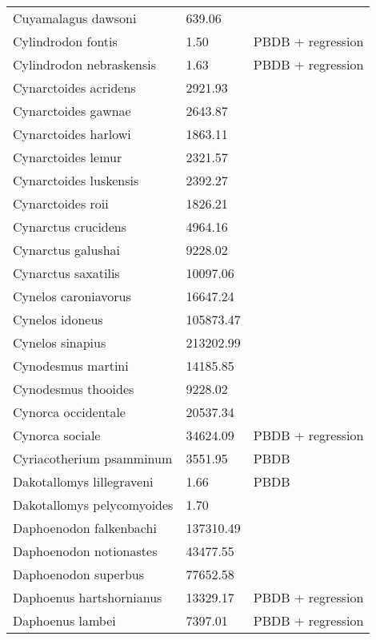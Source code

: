 \documentclass{article}
\begin{document}
\begin{center}
\begin{longtable}{p{} p{} p{}}
    Cuyamalagus dawsoni & 639.06 & \cite{Tomiya2013} \\ 
    Cylindrodon fontis & 1.50 & PBDB + regression \\ 
    Cylindrodon nebraskensis & 1.63 & PBDB + regression \\ 
    Cynarctoides acridens & 2921.93 & \cite{Tomiya2013} \\ 
    Cynarctoides gawnae & 2643.87 & \cite{Tomiya2013} \\ 
    Cynarctoides harlowi & 1863.11 & \cite{Tomiya2013} \\ 
    Cynarctoides lemur & 2321.57 & \cite{Tomiya2013} \\ 
    Cynarctoides luskensis & 2392.27 & \cite{Tomiya2013} \\ 
    Cynarctoides roii & 1826.21 & \cite{Tomiya2013} \\ 
    Cynarctus crucidens & 4964.16 & \cite{Tomiya2013} \\ 
    Cynarctus galushai & 9228.02 & \cite{Tomiya2013} \\ 
    Cynarctus saxatilis & 10097.06 & \cite{Tomiya2013} \\ 
    Cynelos caroniavorus & 16647.24 & \cite{Tomiya2013} \\ 
    Cynelos idoneus & 105873.47 & \cite{Tomiya2013} \\ 
    Cynelos sinapius & 213202.99 & \cite{Tomiya2013} \\ 
    Cynodesmus martini & 14185.85 & \cite{Tomiya2013} \\ 
    Cynodesmus thooides & 9228.02 & \cite{Tomiya2013} \\ 
    Cynorca occidentale & 20537.34 & \cite{Tomiya2013} \\ 
    Cynorca sociale & 34624.09 & PBDB + regression \\ 
    Cyriacotherium psamminum & 3551.95 & PBDB \\ 
    Dakotallomys lillegraveni & 1.66 & PBDB \\ 
    Dakotallomys pelycomyoides & 1.70 & \cite{Mihlbachler2006} \\ 
    Daphoenodon falkenbachi & 137310.49 & \cite{Tomiya2013} \\ 
    Daphoenodon notionastes & 43477.55 & \cite{Tomiya2013} \\ 
    Daphoenodon superbus & 77652.58 & \cite{Tomiya2013} \\ 
    Daphoenus hartshornianus & 13329.17 & PBDB + regression \\ 
    Daphoenus lambei & 7397.01 & PBDB + regression \\ 

\end{longtable}
\end{center}
\end{document}
